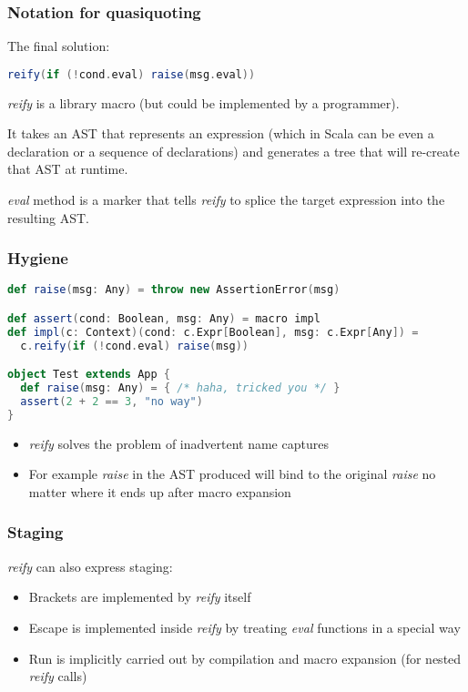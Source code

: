 \documentclass[hyperref={bookmarks=false}]{beamer}
\begin{document}
\begin{frame}[fragile]
\frametitle{Notation for quasiquoting}

The final solution:

\begin{lstlisting}[language=scala]
reify(if (!cond.eval) raise(msg.eval))
\end{lstlisting}

\emph{reify} is a library macro (but could be implemented by a programmer).

It takes an AST that represents an expression (which in Scala can be even a declaration or a sequence of declarations) and generates a tree that will re-create that AST at runtime.

\emph{eval} method is a marker that tells \emph{reify} to splice the target expression into the resulting AST.
\end{frame}

\begin{frame}[fragile]
\frametitle{Hygiene}
\begin{lstlisting}[language=scala]
def raise(msg: Any) = throw new AssertionError(msg)

def assert(cond: Boolean, msg: Any) = macro impl
def impl(c: Context)(cond: c.Expr[Boolean], msg: c.Expr[Any]) =
  c.reify(if (!cond.eval) raise(msg))

object Test extends App {
  def raise(msg: Any) = { /* haha, tricked you */ }
  assert(2 + 2 == 3, "no way")
}
\end{lstlisting}

\begin{itemize}
\item \emph{reify} solves the problem of inadvertent name captures
\item For example \emph{raise} in the AST produced will bind to the original \emph{raise} no matter where it ends up after macro expansion
\end{itemize}
\end{frame}

\begin{frame}[fragile]
\frametitle{Staging}

\emph{reify} can also express staging:

\begin{itemize}
\item Brackets are implemented by \emph{reify} itself
\item Escape is implemented inside \emph{reify} by treating \emph{eval} functions in a special way
\item Run is implicitly carried out by compilation and macro expansion (for nested \emph{reify} calls)
\end{itemize}

\end{frame}
\end{document}
